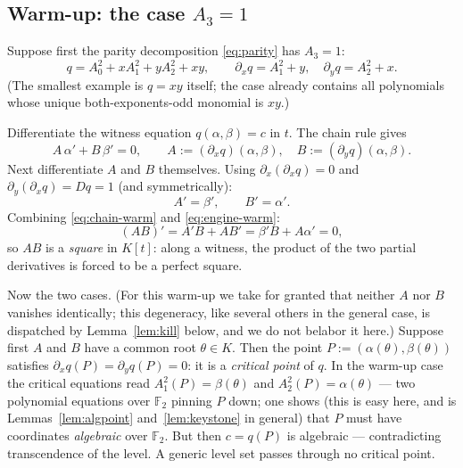 \documentclass[11pt]{article}
\theoremstyle{definition}
\theoremstyle{remark}
\newcommand{\F}{\mathbb{F}}
\begin{document}
\subsection{Warm-up: the case $A_3 = 1$}\label{sec:warmup}

Suppose first the parity decomposition \eqref{eq:parity} has
$A_3 = 1$:
\[
  q = A_0^2 + x A_1^2 + y A_2^2 + xy,
  \qquad
  \partial_x q = A_1^2 + y, \quad \partial_y q = A_2^2 + x .
\]
(The smallest example is $q = xy$ itself; the case already contains
all polynomials whose unique both-exponents-odd monomial is $xy$.)

Differentiate the witness equation $q(\alpha,\beta) = c$ in $t$.  The
chain rule gives
\begin{equation}\label{eq:chain-warm}
  A\,\alpha' + B\,\beta' = 0,
  \qquad
  A := (\partial_x q)(\alpha,\beta), \quad
  B := (\partial_y q)(\alpha,\beta).
\end{equation}
Next differentiate $A$ and $B$ themselves.  Using
$\partial_x(\partial_x q) = 0$ and
$\partial_y(\partial_x q) = Dq = 1$ (and symmetrically):
\begin{equation}\label{eq:engine-warm}
  A' = \beta', \qquad B' = \alpha' .
\end{equation}
Combining \eqref{eq:chain-warm} and \eqref{eq:engine-warm}:
\[
  (AB)' = A'B + AB' = \beta' B + A \alpha' = 0,
\]
so $AB$ is a \emph{square} in $K[t]$: along a
witness, the product of the two partial derivatives is forced to be a
perfect square.

Now the two cases.  (For this warm-up we take for granted that neither $A$
nor $B$ vanishes identically; this degeneracy, like several others in
the general case, is dispatched by Lemma~\ref{lem:kill} below,
and we do not belabor it here.)  Suppose
first $A$ and $B$ have a common root $\theta \in K$.  Then the point
$P := (\alpha(\theta), \beta(\theta))$ satisfies
$\partial_x q (P) = \partial_y q(P) = 0$: it is a \emph{critical
point} of $q$.  In the warm-up case the critical equations read
$A_1^2(P) = \beta(\theta)$ and $A_2^2(P) = \alpha(\theta)$ --- two
polynomial equations over $\F_2$ pinning $P$ down; one shows (this is
easy here, and is Lemmas~\ref{lem:algpoint} and~\ref{lem:keystone} in
general) that $P$ must have coordinates \emph{algebraic} over $\F_2$.
But then $c = q(P)$ is algebraic --- contradicting transcendence of
the level.  A generic level set passes through no critical point.
\end{document}
